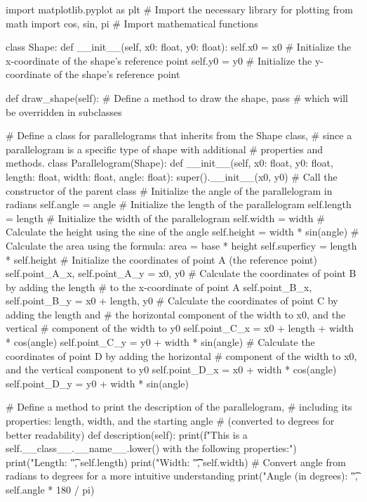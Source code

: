\documentclass[11pt, a4paper]{article}
\begin{document}
\begin{pycode}
import matplotlib.pyplot as plt  # Import the necessary library for plotting
from math import cos, sin, pi    # Import mathematical functions

class Shape:
    def __init__(self, x0: float, y0: float):
        self.x0 = x0  # Initialize the x-coordinate of the shape's reference point
        self.y0 = y0  # Initialize the y-coordinate of the shape's reference point

    def draw_shape(self):  # Define a method to draw the shape,
        pass               # which will be overridden in subclasses

# Define a class for parallelograms that inherits from the Shape class,
# since a parallelogram is a specific type of shape with additional
# properties and methods.
class Parallelogram(Shape):
    def __init__(self, x0: float, y0: float,
                 length: float, width: float, angle: float):
        super().__init__(x0, y0)  # Call the constructor of the parent class
        # Initialize the angle of the parallelogram in radians
        self.angle  = angle
        # Initialize the length of the parallelogram
        self.length = length
        # Initialize the width of the parallelogram
        self.width  = width
        # Calculate the height using the sine of the angle
        self.height = width * sin(angle)
        # Calculate the area using the formula: area = base * height
        self.superficy = length * self.height
        # Initialize the coordinates of point A (the reference point)
        self.point_A_x, self.point_A_y = x0, y0
        # Calculate the coordinates of point B by adding the length
        # to the x-coordinate of point A
        self.point_B_x, self.point_B_y = x0 + length, y0
        # Calculate the coordinates of point C by adding the length and
        # the horizontal component of the width to x0, and the vertical
        # component of the width to y0
        self.point_C_x = x0 + length + width * cos(angle)
        self.point_C_y = y0 + width * sin(angle)
        # Calculate the coordinates of point D by adding the horizontal
        # component of the width to x0, and the vertical component to y0
        self.point_D_x = x0 + width * cos(angle)
        self.point_D_y = y0 + width * sin(angle)

    # Define a method to print the description of the parallelogram,
    # including its properties: length, width, and the starting angle
    # (converted to degrees for better readability)
    def description(self):
        print(f"This is a {self.__class__.__name__.lower()} with the following properties:")
        print("Length: \t", self.length)
        print("Width: \t\t", self.width)
        # Convert angle from radians to degrees for a more intuitive understanding
        print("Angle (in degrees): \t", self.angle * 180 / pi)


\end{pycode}
\end{document}
